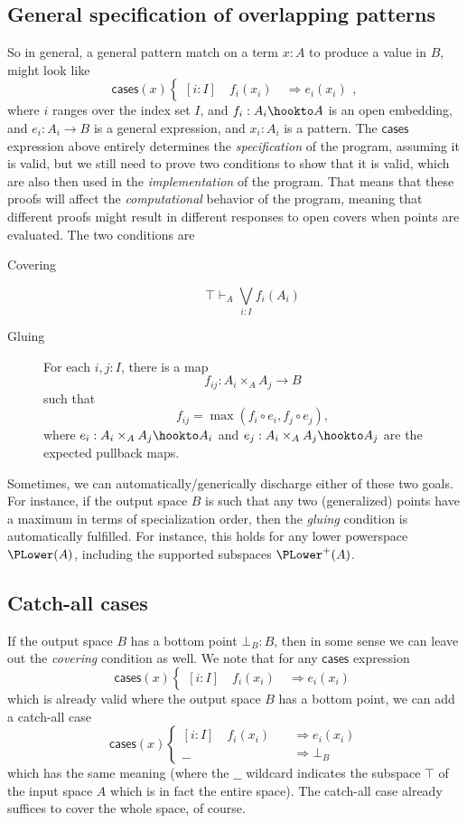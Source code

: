 \subsection{General specification of overlapping patterns}
So in general, a general pattern match on a term $x : A$ to produce a value in $B$, might look like
\[
\mathsf{cases}(x)
\begin{cases}
[i : I] \quad f_i(x_i) \quad \Longrightarrow e_i(x_i)
\end{cases},
\]
where $i$ ranges over the index set $I$, and $f_i : A_i \hookto A$ is an open embedding, and $e_i : A_i \to B$ is a general expression, and $x_i : A_i$ is a pattern. The $\mathsf{cases}$ expression above entirely determines the \emph{specification} of the program, assuming it is valid, but we still need to prove two conditions to show that it is valid, which are also then used in the \emph{implementation} of the program. That means that these proofs will affect the \emph{computational} behavior of the program, meaning that different proofs might result in different responses to open covers when points are evaluated. The two conditions are
\begin{description}
\item[Covering]
\[
\top \vdash_A \bigvee_{i : I} f_i(A_i)
\]
\item[Gluing] For each $i, j : I$, there is a map
\[
f_{ij} : A_i \times_A A_j \to B
\]
such that 
\[
f_{ij} = \max(f_i \circ e_i, f_j \circ e_j),
\]
where $e_i : A_i \times_A A_j \hookto A_i$ and $e_j : A_i \times_A A_j \hookto A_j$ are the expected pullback maps.
\end{description}

Sometimes, we can automatically/generically discharge either of these two goals. For instance, if the output space $B$ is such that any two (generalized) points have a maximum in terms of specialization order, then the \emph{gluing} condition is automatically fulfilled. For instance, this holds for any lower powerspace $\PLower(A)$, including the supported subspaces $\PLower^+(A)$.

\subsection{Catch-all cases}

If the output space $B$ has a bottom point $\bot_B : B$, then in some sense we can leave out the \emph{covering} condition as well. We note that for any $\mathsf{cases}$ expression
\[
\mathsf{cases}(x)
\begin{cases}
[i : I] \quad f_i(x_i) \quad \Longrightarrow e_i(x_i)
\end{cases}
\]
which is already valid where the output space $B$ has a bottom point, we can add a catch-all case
\[
\mathsf{cases}(x)
\begin{cases}
[i : I] \quad f_i(x_i) \quad &\Longrightarrow e_i(x_i)
\\ \_\_ \quad &\Longrightarrow \bot_B
\end{cases}
\]
which has the same meaning (where the $\_\_$ wildcard indicates the subspace $\top$ of the input space $A$ which is in fact the entire space). The catch-all case already suffices to cover the whole space, of course. 

